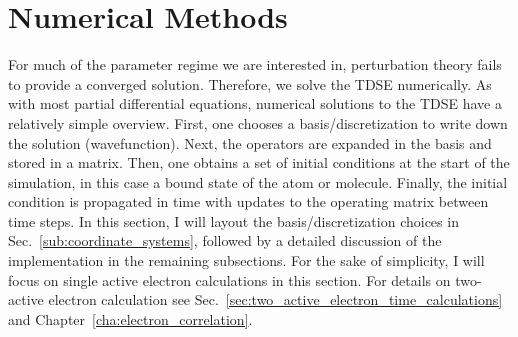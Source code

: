 
\section{Numerical Methods} %
\label{sec:numerical_methods}
For much of the parameter regime we are interested in, perturbation theory fails to provide a converged solution. Therefore, we solve the TDSE numerically. As with most partial differential equations, numerical solutions to the TDSE have a relatively simple overview. First, one chooses a basis/discretization to write down the solution (wavefunction). Next, the operators are expanded in the basis and stored in a matrix. Then, one obtains a set of initial conditions at the start of the simulation, in this case a bound state of the atom or molecule. Finally, the initial condition is propagated in time with updates to the operating matrix between time steps. In this section, I will layout the basis/discretization choices in Sec.~\ref{sub:coordinate_systems}, followed by a detailed discussion of the implementation in the remaining subsections. For the sake of simplicity, I will focus on single active {}electron calculations in this section. For details on two-active electron calculation see Sec.~\ref{sec:two_active_electron_time_calculations} and Chapter~\ref{cha:electron_correlation}.



